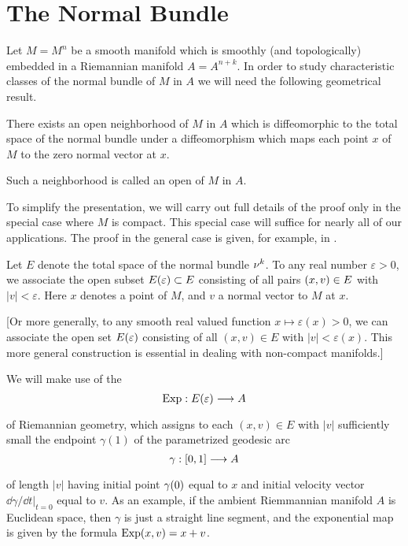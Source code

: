 \documentclass[../main]{subfiles}
\begin{document}
\section{The Normal Bundle}\label{sec:11.1}
Let $M=M^{n}$ be a smooth manifold which is smoothly (and topologically) embedded in a Riemannian manifold $A=A^{n+k}$. In order to study characteristic classes of the normal bundle of $M$ in $A$ we will need the following geometrical result.

\begin{theorem} \label{thm:11.01}
There exists an open neighborhood of $M$ in $A$ which is diffeomorphic to the total space of the normal bundle under a diffeomorphism which maps each point $x$ of $M$ to the zero normal vector at $x$.
\end{theorem}

Such a neighborhood is called an open  of $M$ in $A$.

To simplify the presentation, we will carry out full details of the proof only in the special case where $M$ is compact. This special case will suffice for nearly all of our applications. The proof in the general case is given, for example, in \cite{langmanifold}.

Let $E$ denote the total space of the normal bundle $\nu_{}^k$. To any real number $\varepsilon>0$, we associate the open subset $E(\varepsilon) \subset E$ consisting of all pairs $(x, v) \in E$ with $|v|<\varepsilon$. Here $x$ denotes a point of $M$, and $v$ a normal vector to $M$ at $x$.

[Or more generally, to any smooth real valued function $x \mapsto \varepsilon(x)>0$, we can associate the open set $E(\varepsilon)$ consisting of all $(x, v) \in E$ with $|v|<\varepsilon(x)$. This more general construction is essential in dealing with non-compact manifolds.]

We will make use of the 
\[
\Exp: \total(\varepsilon) \varrightarrow{} A
\]
of Riemannian geometry, which assigns to each $(x, v) \in E$ with $|v|$ sufficiently small the endpoint $\gamma(1)$ of the parametrized geodesic arc
\[
\gamma: [0,1] \varrightarrow{} A
\]
of length $|v|$ having initial point $\gamma(0)$ equal to $x$ and initial velocity vector $\dd \gamma /\dd t |_{t=0}$ equal to $v$. As an example, if the ambient Riemmannian manifold $A$ is Euclidean space, then $\gamma$ is just a straight line segment, and the exponential map is given by the formula $\operatorname{Exp}(x,v)=x+v$.
\end{document}
